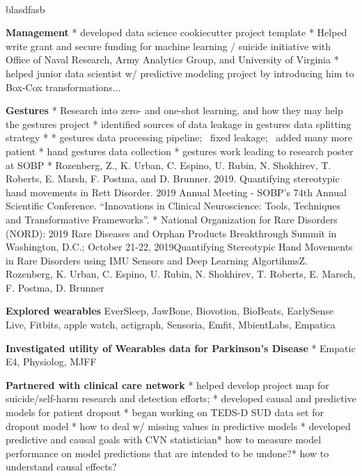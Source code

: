  \\
blasdfasb
\begin{itemize*}
  \item\leftandright
    {\textbf{Management}}
    * developed data science cookiecutter project template
    * Helped write grant and secure funding for machine learning / suicide
    initiative with Office of Naval Research, Army Analytics Group, and
    University of Virginia
    * helped junior data scientist w/ predictive modeling project by
    introducing him to Box-Cox transformations...
  \item\leftandright
    {\textbf{Gestures}}
    * Research into zero- and one-shot learning, and how they may help the
    gestures project
    * identified sources of data leakage in gestures data splitting
    strategy
    * * gestures data processing pipeline;  fixed leakage;  added many
    more patient
    * hand gestures data collection
    * gestures work leading to research poster at SOBP
    * Rozenberg, Z., K. Urban, C. Espino, U. Rubin, N. Shokhirev, T.
      Roberts, E. Marsh, F. Postma, and D. Brunner. 2019. Quantifying
      stereotypic hand movements in Rett Disorder. 2019 Annual Meeting -
      SOBP’s 74th Annual Scientific Conference. “Innovations in Clinical
      Neuroscience: Tools, Techniques and Transformative Frameworks”.
    * National Organization for Rare
      Disorders (NORD): 2019 Rare Diseases and Orphan Products
      Breakthrough Summit in Washington, D.C.; October 21-22,
      2019Quantifying Stereotypic Hand Movements in Rare Disorders using
      IMU Sensors and Deep Learning AlgortihmsZ. Rozenberg, K. Urban, C.
      Espino, U. Rubin, N. Shokhirev, T. Roberts, E. Marsch, F. Postma, D.
      Brunner

  \item\leftandright
    {\textbf{Explored wearables}}
    EverSleep, JawBone, Biovotion, BioBeats, EarlySense Live, Fitbits,
    apple watch, actigraph, Sensoria, Emfit, MbientLabs, Empatica
  \item\leftandright
    {\textbf{Investigated utility of Wearables data for Parkinson's
    Disease}}
    * Empatic E4, Physiolog, MJFF
  \item\leftandright
    {\textbf{Partnered with clinical care network}}
    * helped develop project map for suicide/self-harm research and detection
    efforts; * developed causal and predictive models for patient
    dropout
    * began working on TEDS-D SUD data set for dropout model
    * how to deal w/ missing values in predictive models
    * developed predictive and causal goals with CVN statistician* how
    to measure model performance on model predictions that are intended
    to be undone?* how to understand causal effects?


\end{itemize*}
